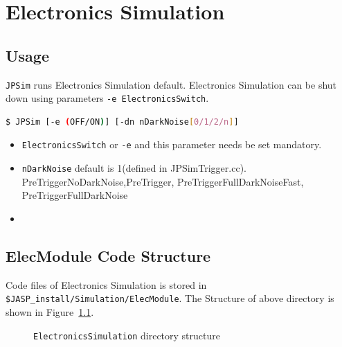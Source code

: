 \graphicspath{{data/SimModule/ElectronicsSimualtion/}}

\chapter[Electronics Simulation]
{Electronics Simulation}
\section{Usage}
\texttt{JPSim} runs Electronics Simulation default. Electronics Simulation can be shut down using parameters \texttt{-e ElectronicsSwitch}.
\begin{lstlisting}[language=bash]
$ JPSim [-e (OFF/ON)] [-dn nDarkNoise[0/1/2/n]]
\end{lstlisting}
\begin{itemize}
    \item {\tt ElectronicsSwitch} or \texttt{-e} and this parameter needs be set mandatory.
    \item {\tt nDarkNoise} default is 1(defined in JPSimTrigger.cc). PreTriggerNoDarkNoise,PreTrigger, PreTriggerFullDarkNoiseFast, PreTriggerFullDarkNoise
    \item 
\end{itemize}
\section{ElecModule Code Structure}
Code files of Electronics Simulation is stored in \texttt{\$JASP\_install/Simulation/ElecModule}. The Structure of above directory is shown in Figure~\ref{fig:elecstructure}.
\begin{figure}[htbp]
    \caption{{\tt ElectronicsSimulation} directory structure}
    \label{fig:elecstructure}
\end{figure}
